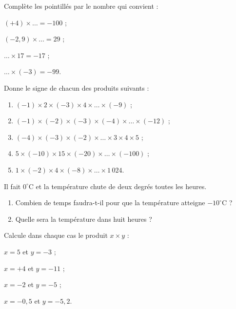 \begin{exercice}
Complète les pointillés par le nombre qui convient :
\begin{colenumerate}{2}
 \item $(+4) \times \ldots = -100$ ;
 \item $(-2,9) \times \ldots = 29$ ;  
 \item $\ldots \times 17 = -17$ ;
 \item $\ldots \times (-3) = -99$.
 \end{colenumerate}
\end{exercice}


\begin{exercice}
Donne le signe de chacun des produits suivants :
\begin{enumerate}
 \item $(-1) \times 2 \times (-3) \times 4 \times \ldots \times (-9)$ ;
 \item $(-1) \times (-2) \times (-3) \times (-4) \times \ldots \times (-12)$ ;
 \item $(-4) \times (-3) \times (-2) \times \ldots \times 3 \times 4 \times 5$ ;
 \item $5 \times (-10) \times 15 \times (-20) \times \ldots \times (-100)$ ;
 \item $1 \times (-2) \times 4 \times (-8) \times \ldots \times 1\,024$.
 \end{enumerate}
\end{exercice}


\begin{exercice}[Températures]
Il fait $0^\circ$C et la température chute de deux degrés toutes les heures. 
\begin{enumerate}
 \item Combien de temps faudra-t-il pour que la température atteigne $-10^\circ$C ?
 \item Quelle sera la température dans huit heures ?
 \end{enumerate}
\end{exercice}


\begin{exercice}
Calcule dans chaque cas le produit $x \times y$ :
\begin{colenumerate}{2}
 \item $x = 5$ et $y = -3$ ;
 \item $x = +4$ et $y = -11$ ;
 \item $x = -2$ et $y = -5$ ;
 \item $x = -0,5$ et $y = -5,2$.
 \end{colenumerate}
\end{exercice}


